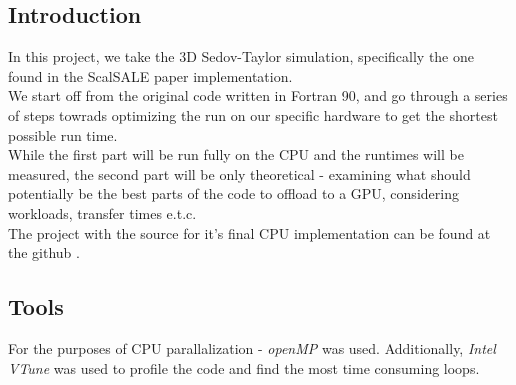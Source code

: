 \subsection*{Introduction}
In this project, we take the 3D Sedov-Taylor simulation, specifically the
one found in the ScalSALE\cite{scalsale} paper implementation.\\
We start off from the original code written in Fortran 90, 
and go through a series of steps towrads optimizing the run on our specific
hardware to get the shortest possible run time.\\
While the first part will be run fully on the CPU and the runtimes will be measured,
the second part will be only theoretical - examining what should potentially
be the best parts of the code to offload to a GPU, considering workloads,
transfer times e.t.c.\\
The project with the source for
it's final CPU implementation can be found at the github \cite{this_repo}.

\subsection*{Tools}
For the purposes of CPU parallalization - \emph{openMP} was used.
Additionally, \emph{Intel VTune} was used to profile the code and
find the most time consuming loops.
